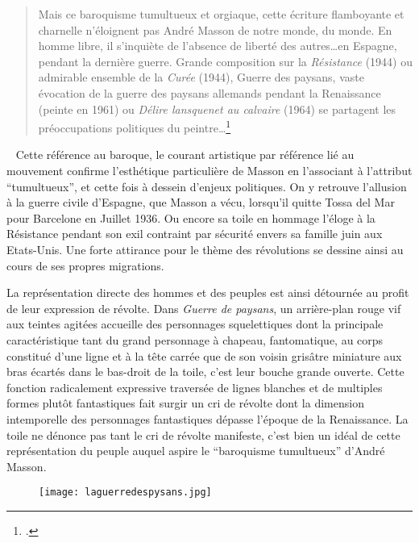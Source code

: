 \begin{quote}
Mais ce baroquisme tumultueux et orgiaque, cette écriture flamboyante et charnelle n’éloignent pas André Masson de notre monde, du monde. En homme libre, il s’inquiète de l’absence de liberté des autres…en Espagne, pendant la dernière guerre. Grande composition sur la \emph{Résistance} (1944) ou admirable ensemble de la \emph{Curée} (1944), Guerre des paysans, vaste évocation de la guerre des paysans allemands pendant la Renaissance (peinte en 1961) ou \emph{Délire lansquenet au calvaire} (1964) se partagent les préoccupations politiques du peintre…\footcite{massonlyon}\end{quote}
 
	Cette référence au baroque, le courant artistique par référence lié au mouvement confirme l’esthétique particulière de Masson en l’associant à l’attribut \enquote{tumultueux}, et cette fois à dessein d’enjeux politiques. On y retrouve l'allusion à la guerre civile d’Espagne, que Masson a vécu, lorsqu’il quitte Tossa del Mar pour Barcelone en Juillet 1936. Ou encore sa toile en hommage l’éloge à la Résistance pendant son exil contraint par sécurité envers sa famille juin aux Etats-Unis. Une forte attirance pour le thème des révolutions se dessine ainsi au cours de ses propres migrations. 

La représentation directe des hommes et des peuples est ainsi détournée  au profit de leur expression de révolte. Dans \emph{Guerre de paysans}, un arrière-plan rouge vif aux teintes agitées accueille des personnages squelettiques dont la principale caractéristique tant du grand personnage à chapeau, fantomatique, au corps constitué d’une ligne et à la tête carrée que de son voisin grisâtre miniature aux bras écartés dans le bas-droit de la toile, c’est leur bouche grande ouverte. Cette fonction radicalement expressive traversée de lignes blanches et de multiples formes plutôt fantastiques fait surgir un cri de révolte dont la dimension intemporelle des personnages fantastiques dépasse l’époque de la Renaissance. La toile ne dénonce pas tant le cri de révolte manifeste, c’est bien un idéal de cette représentation du peuple auquel aspire le \enquote{baroquisme tumultueux} d’André Masson.

\begin{figure}[H]
   \centering
   \texttt{[image: laguerredespysans.jpg]}
	\caption{\cite{massonlyon}}\label{fig:Guerre des paysans}
\end{figure}


